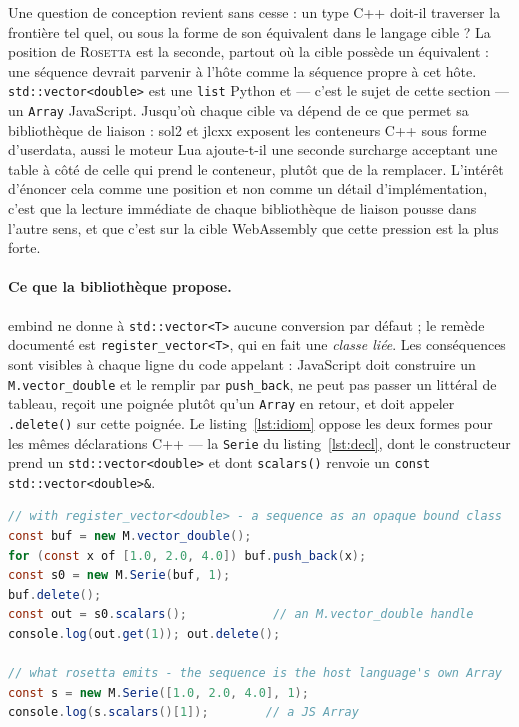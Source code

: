 \documentclass[11pt,a4paper]{article}
\newcommand{\rosetta}{\textsc{Rosetta}}
\newcommand{\code}[1]{\texttt{\small #1}}
\begin{document}
Une question de conception revient sans cesse : un type C++ doit-il traverser la
frontière tel quel, ou sous la forme de son équivalent dans le langage cible ?
La position de \rosetta{} est la seconde, partout où la cible possède un
équivalent : une séquence devrait parvenir à l'hôte comme la séquence propre à
cet hôte. \code{std::vector<double>} est une \code{list} Python et --- c'est le
sujet de cette section --- un \code{Array} JavaScript. Jusqu'où chaque cible va
dépend de ce que permet sa bibliothèque de liaison : sol2 et jlcxx exposent les
conteneurs C++ sous forme d'userdata, aussi le moteur Lua ajoute-t-il une
seconde surcharge acceptant une table à côté de celle qui prend le conteneur,
plutôt que de la remplacer. L'intérêt d'énoncer cela comme une position et non
comme un détail d'implémentation, c'est que la lecture immédiate de chaque
bibliothèque de liaison pousse dans l'autre sens, et que c'est sur la cible
WebAssembly que cette pression est la plus forte.

\paragraph{Ce que la bibliothèque propose.} embind ne donne à
\code{std::vector<T>} aucune conversion par défaut ; le remède documenté est
\code{register\_vector<T>}, qui en fait une \emph{classe liée}. Les conséquences
sont visibles à chaque ligne du code appelant : JavaScript doit construire un
\code{M.vector\_double} et le remplir par \code{push\_back}, ne peut pas passer
un littéral de tableau, reçoit une poignée plutôt qu'un \code{Array} en retour,
et doit appeler \code{.delete()} sur cette poignée. Le
listing~\ref{lst:idiom} oppose les deux formes pour les mêmes déclarations
C++ --- la \code{Serie} du listing~\ref{lst:decl}, dont le constructeur prend un
\code{std::vector<double>} et dont \code{scalars()} renvoie un
\code{const std::vector<double>\&}.

\begin{lstlisting}[language=Java,caption={Les deux mêmes signatures C++, vues depuis JavaScript. En haut : ce que donne \code{register\_vector}. En bas : ce que produit \rosetta.},label={lst:idiom}]
// with register_vector<double> - a sequence as an opaque bound class
const buf = new M.vector_double();
for (const x of [1.0, 2.0, 4.0]) buf.push_back(x);
const s0 = new M.Serie(buf, 1);
buf.delete();
const out = s0.scalars();            // an M.vector_double handle
console.log(out.get(1)); out.delete();

// what rosetta emits - the sequence is the host language's own Array
const s = new M.Serie([1.0, 2.0, 4.0], 1);
console.log(s.scalars()[1]);        // a JS Array
\end{lstlisting}
\end{document}
